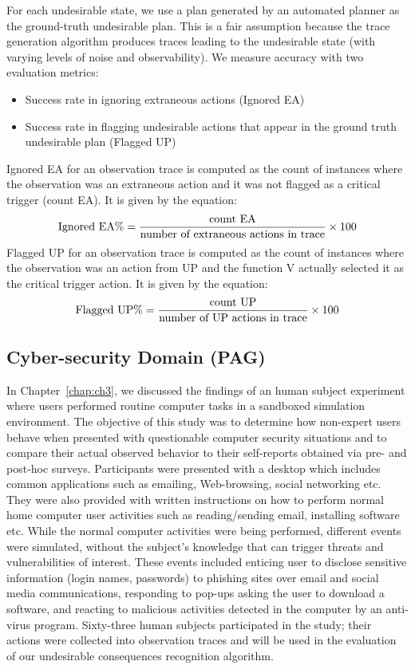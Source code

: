 For each undesirable state, we use a plan generated by an automated planner as the ground-truth undesirable plan. 
This is a fair assumption because the trace generation algorithm produces traces leading to the undesirable state (with varying levels of noise and observability). 
We measure accuracy with two evaluation metrics:
\begin{itemize}
\item Success rate in ignoring extraneous actions (Ignored EA)
\item Success rate in flagging undesirable actions that appear in the ground truth undesirable plan (Flagged UP)
\end{itemize}

Ignored EA for an observation trace is computed as the count of instances where the observation was an extraneous action and it was not flagged as a critical trigger (count EA). It is given by the equation:
\begin{equation}
\textup{Ignored EA}\%= \frac{\textup{count EA}}{\textup{number of extraneous actions in trace}}\times 100
\end{equation}
Flagged UP for an observation trace is computed as the count of instances where the observation was an action from UP and the function V actually selected it as the critical trigger action. It is given by the equation:
\begin{equation}
\textup{Flagged UP}\%= \frac{\textup{count UP}}{\textup{number of UP actions in trace}}\times 100
\end{equation}

\subsection{Cyber-security Domain (PAG)}
In Chapter~\ref{chap:ch3}, we discussed the findings of an human subject experiment where users performed routine computer tasks in a sandboxed simulation environment.
The objective of this study was to determine how non-expert users behave when presented with questionable computer security situations and to compare their actual observed behavior to their self-reports obtained via pre- and post-hoc surveys. 
Participants were presented with a desktop which includes common applications such as emailing, Web-browsing, social networking etc. 
They were also provided with written instructions on how to perform normal home computer user activities such as reading/sending email, installing software etc. While the normal computer activities were being performed, different events were simulated, without the subject's knowledge that can trigger threats and vulnerabilities of interest. 
These events included enticing user to disclose sensitive information (login names, passwords) to phishing sites over email and social media communications, responding to pop-ups asking the user to download a software, and reacting to malicious activities detected in the computer by an anti-virus program. 
Sixty-three human subjects participated in the study; their actions were collected into observation traces and will be used in the evaluation of our undesirable consequences recognition algorithm.


